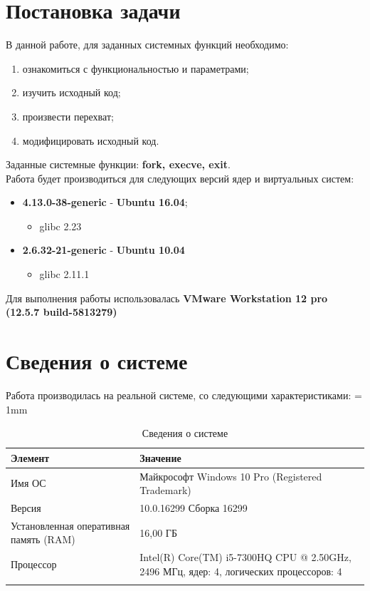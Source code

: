 


\tableofcontents
\clearpage

%
\section{Постановка задачи}
В данной работе, для заданных системных функций необходимо:
\begin{enumerate}
\item ознакомиться с функциональностью и параметрами;
\item изучить исходный код;
\item произвести перехват;
\item модифицировать исходный код.
\end{enumerate}
Заданные системные функции: \textbf{fork, execve, exit}.\\
Работа будет производиться для следующих версий ядер и виртуальных систем:
\begin{itemize}
\item \textbf{4.13.0-38-generic} - \textbf{Ubuntu 16.04};
\begin{itemize}
\item glibc 2.23
\end{itemize}
\item \textbf{2.6.32-21-generic} - \textbf{Ubuntu 10.04}
\begin{itemize}
\item glibc 2.11.1
\end{itemize}
\end{itemize}
Для выполнения работы использовалась \textbf{VMware Workstation 12 pro (12.5.7 build-5813279)}

\section{Сведения о системе}
Работа производилась на реальной системе, со следующими характеристиками:
\tabulinesep = 1mm
\begin{longtabu} to \textwidth {|X[10, c , m ] |X[25, c , m ] | }\firsthline\hline

\textbf{Элемент}&\textbf{Значение}\\ \hline \endfirsthead
	
Имя ОС&Майкрософт Windows 10 Pro (Registered Trademark)\\ \hline
Версия&10.0.16299 Сборка 16299\\ \hline
Установленная оперативная память (RAM) &16,00 ГБ\\ \hline
Процессор&Intel(R) Core(TM) i5-7300HQ CPU @ 2.50GHz, 2496 МГц, ядер: 4, логических процессоров: 4\\ \hline
\caption{Сведения о системе}
\end{longtabu}

